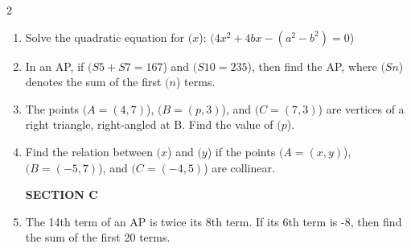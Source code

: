 \documentclass[a4paper,12pt]{article}
\begin{document}
\begin{multicols}{2}
\begin{enumerate}
  \item Solve the quadratic equation for $( x $): $( 4x^2 + 4bx - (a^2 - b^2) = 0 $)

  \item In an AP, if $( S5 + S7 = 167 $) and $( S{10} = 235 $), then find the AP, where $( Sn $) denotes the sum of the first $( n $) terms.

  \item The points $( A = (4, 7) $), $( B = (p, 3) $), and $( C = (7, 3) $) are vertices of a right triangle, right-angled at B. Find the value of $( p $).

  \item Find the relation between $( x $) and $( y $) if the points $( A = (x, y) $), $( B = (-5, 7) $), and $( C = (-4, 5) $) are collinear.

\textbf{SECTION C}\\

  \item The 14th term of an AP is twice its 8th term. If its 6th term is -8, then find the sum of the first 20 terms.
\end{enumerate}
\end{multicols}
\end{document}
